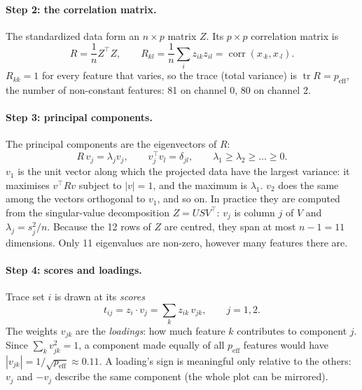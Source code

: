 \documentclass[10pt]{article}
\begin{document}
\paragraph{Step 2: the correlation matrix.} The standardized data form an $n\times p$ matrix $Z$. Its $p\times p$
correlation matrix is
\begin{equation}
R = \frac1n Z^\top Z, \qquad R_{kl} = \frac1n\sum_i z_{ik} z_{il} = \operatorname{corr}(x_{\cdot k}, x_{\cdot l}).
\end{equation}
$R_{kk} = 1$ for every feature that varies, so the trace (total variance) is $\operatorname{tr}R = p_\text{eff}$, the number of
non-constant features: 81 on channel 0, 80 on channel 2.

\paragraph{Step 3: principal components.} The principal components are the eigenvectors of $R$:
\begin{equation}
R\,v_j = \lambda_j v_j, \qquad v_j^\top v_l = \delta_{jl}, \qquad \lambda_1 \ge \lambda_2 \ge \dots \ge 0 .
\end{equation}
$v_1$ is the unit vector along which the projected data have the largest variance: it maximises $v^\top R v$ subject to
$|v| = 1$, and the maximum is $\lambda_1$. $v_2$ does the same among the vectors orthogonal to $v_1$, and so on. In practice
they are computed from the singular-value decomposition $Z = U S V^\top$: $v_j$ is column $j$ of $V$ and
$\lambda_j = s_j^2/n$. Because the 12 rows of $Z$ are centred, they span at most $n-1 = 11$ dimensions. Only 11 eigenvalues
are non-zero, however many features there are.

\paragraph{Step 4: scores and loadings.} Trace set $i$ is drawn at its \emph{scores}
\begin{equation}
t_{ij} = z_i\cdot v_j = \sum_{k} z_{ik}\,v_{jk}, \qquad j = 1,2 .
\end{equation}
The weights $v_{jk}$ are the \emph{loadings}: how much feature $k$ contributes to component $j$. Since $\sum_k v_{jk}^2 = 1$,
a component made equally of all $p_\text{eff}$ features would have $|v_{jk}| = 1/\sqrt{p_\text{eff}} \approx 0.11$. A
loading's sign is meaningful only relative to the others: $v_j$ and $-v_j$ describe the same component (the whole plot
can be mirrored).
\end{document}
